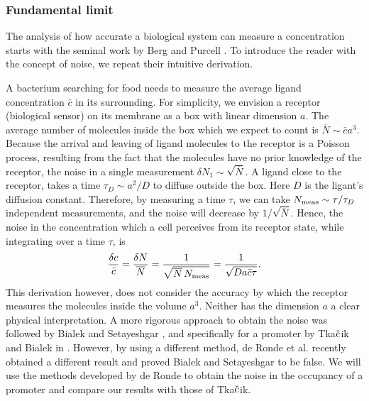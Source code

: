 \subsubsection{Fundamental limit}
The analysis of how accurate a biological system can measure a concentration starts with the seminal work by Berg and Purcell \cite{Berg1977}. To introduce the reader with the concept of noise, we repeat their intuitive derivation. 

A bacterium searching for food needs to measure the average ligand concentration $\bar{c}$ in its surrounding. For simplicity, we envision a receptor (biological sensor) on its membrane as a box with linear dimension $a$. The average number of molecules inside the box which we expect to count is $\overline{N} \sim \bar{c} a^3$. Because the arrival and leaving of ligand molecules to the receptor is a Poisson process, resulting from the fact that the molecules have no prior knowledge of the receptor, the noise in a single measurement $\delta N_1 \sim \sqrt{\overline{N}}$. A ligand close to the receptor, takes a time $\tau_D \sim a^2/D$ to diffuse outside the box. Here $D$ is the ligant's diffusion constant. Therefore, by measuring a time $\tau$, we can take $N_{\rm meas} \sim \tau/\tau_D$ independent measurements, and the noise will decrease by $1/\sqrt{\overline{N}}$. Hence, the noise in the concentration which a cell perceives from its receptor state, while integrating over a time $\tau$, is
\begin{equation}
 \frac{\delta c}{\bar{c}} = \frac{\delta N}{\overline{N}} = \frac{1}{\sqrt{\overline{N}\,N_{\rm meas}}} = \frac{1}{\sqrt{D a \bar{c} \tau}}.
\end{equation}
This derivation however, does not consider the accuracy by which the receptor measures the molecules inside the volume $a^3$. Neither has the dimension $a$ a clear physical interpretation. A more rigorous approach to obtain the noise was followed by Bialek and Setayeshgar \cite{Bialek2005}, and specifically for a promoter by Tka$\check{\rm c}$ik and Bialek in \cite{Tkacik2009}. However, by using a different method, de Ronde et al. recently obtained a different result \cite{DeRonde2012} and proved Bialek and Setayeshgar to be false. We will use the methods developed by de Ronde to obtain the noise in the occupancy of a promoter and compare our results with those of Tka$\check{\rm c}$ik.

